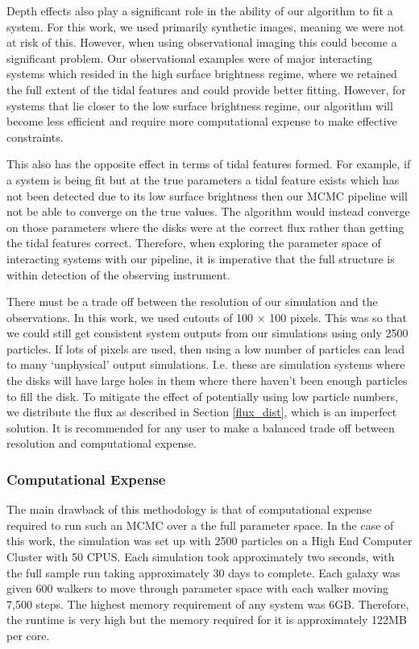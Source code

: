Depth effects also play a significant role in the ability of our algorithm to fit a system. For this work, we used primarily synthetic images, meaning we were not at risk of this. However, when using observational imaging this could become a significant problem. Our observational examples were of major interacting systems which resided in the high surface brightness regime, where we retained the full extent of the tidal features and could provide better fitting. However, for systems that lie closer to the low surface brightness regime, our algorithm will become less efficient and require more computational expense to make effective constraints.

This also has the opposite effect in terms of tidal features formed. For example, if a system is being fit but at the true parameters a tidal feature exists which has not been detected due to its low surface brightness then our MCMC pipeline will not be able to converge on the true values. The algorithm would instead converge on those parameters where the disks were at the correct flux rather than getting the tidal features correct. Therefore, when exploring the parameter space of interacting systems with our pipeline, it is imperative that the full structure is within detection of the observing instrument.

There must be a trade off between the resolution of our simulation and the observations. In this work, we used cutouts of 100 $\times$ 100 pixels. This was so that we could still get consistent system outputs from our simulations using only 2500 particles. If lots of pixels are used, then using a low number of particles can lead to many `unphysical' output simulations. I.e. these are simulation systems where the disks will have large holes in them where there haven't been enough particles to fill the disk. To mitigate the effect of potentially using low particle numbers, we distribute the flux as described in Section \ref{flux_dist}, which is an imperfect solution. It is recommended for any user to make a balanced trade off between resolution and computational expense.

\subsubsection{Computational Expense}\label{computational_expense}
\noindent The main drawback of this methodology is that of computational expense required to run such an MCMC over a the full parameter space. In the case of this work, the simulation was set up with 2500 particles on a High End Computer Cluster with 50 CPUS. Each simulation took approximately two seconds, with the full sample run taking approximately 30 days to complete. Each galaxy was given 600 walkers to move through parameter space with each walker moving 7,500 steps. The highest memory requirement of any system was 6GB. Therefore, the runtime is very high but the memory required for it is approximately 122MB per core.

